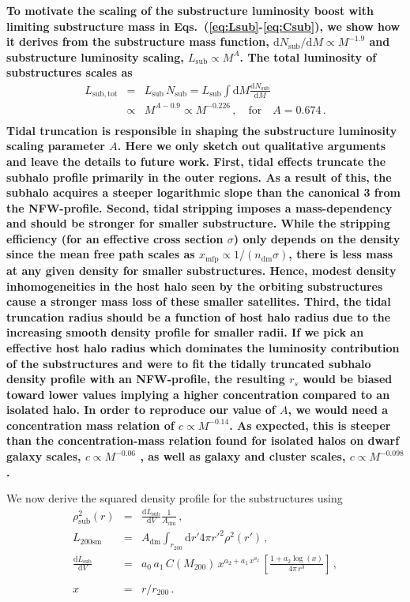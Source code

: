 \documentclass[10pt,aps,pra,reprint,amsmath,amsfonts,amssymb,showpacs,nofootinbib,floatfix]{revtex4-1}
\def\C#1{{\bf #1}}
\newcommand{\rmn}{\mathrm}
\newcommand{\sub}{\rmn{sub}}
\newcommand{\sm}{\rmn{sm}}
\newcommand{\dd}{\rmn{d}}
\newcommand{\rs}{\ensuremath{r_s}}
\newcommand{\rvir}{r_{200}}
\newcommand{\mvir}{M_{200}}
\begin{document}
\C{To motivate the scaling of the substructure luminosity boost with
  limiting substructure mass in Eqs.~(\ref{eq:Lsub}-\ref{eq:Csub}),
  we show how it derives from the substructure mass function, $\dd
  N_\sub/\dd M \propto M^{-1.9}$
  \cite{2008MNRAS.391.1685S,2008Natur.456...73S} and substructure
  luminosity scaling, $L_\sub \propto M^A$. The total luminosity of
  substructures scales as
\begin{eqnarray}
  L_\rmn{sub,tot} &=& L_\sub\,N_\sub = L_\sub 
\int \dd M \frac{\dd N_\sub}{\dd M} \nonumber\\
 &\propto& M^{A-0.9} \propto M^{-0.226}\,,\quad
\rmn{for}\quad A=0.674\,. \nonumber\\
&&
\end{eqnarray}
Tidal truncation is responsible in shaping the substructure luminosity
scaling parameter $A$. Here we only sketch out qualitative arguments
and leave the details to future work. First, tidal effects truncate
the subhalo profile primarily in the outer regions. As a result of
this, the subhalo acquires a steeper logarithmic slope than the
canonical 3 from the NFW-profile. Second, tidal stripping imposes a
mass-dependency and should be stronger for smaller substructure. While
the stripping efficiency (for an effective cross section $\sigma$)
only depends on the density since the mean free path scales as
$x_\rmn{mfp} \propto 1/(n_\rmn{dm} \sigma)$, there is less mass at any
given density for smaller substructures. Hence, modest density
inhomogeneities in the host halo seen by the orbiting substructures
cause a stronger mass loss of these smaller satellites. Third, the
tidal truncation radius should be a function of host halo radius due
to the increasing smooth density profile for smaller radii.  If we
pick an effective host halo radius which dominates the luminosity
contribution of the substructures and were to fit the tidally
truncated subhalo density profile with an NFW-profile, the resulting
$\rs$ would be biased toward lower values implying a higher
concentration compared to an isolated halo. In order to reproduce our
value of $A$, we would need a concentration mass relation of $c\propto
M^{-0.14}$.  As expected, this is steeper than the concentration-mass
relation found for isolated halos on dwarf galaxy scales, $c \propto
M^{-0.06}$ \cite{2011arXiv1101.2020I}, as well as galaxy and cluster
scales, $c \propto M^{-0.098}$ \cite{2008MNRAS.391.1940M}.}

We now derive the squared density profile for the substructures
using
\begin{eqnarray}
\rho_\rmn{sub}^2(r) &=& \frac{\dd L_\rmn{sub}}{\dd V} \frac{1}{A_{\rmn{dm}}}\,,\label{eq:rho_sub}\\
L_{200\sm} &=&  A_{\rmn{dm}} \int_{\rvir} \dd r' 4\pi r'^2 \rho^2(r')\,,\label{eq:Lsm}\\
 \frac{\dd L_\rmn{sub}}{\dd V} &=& a_0\,a_1\,C(\mvir)\,x^{a_2+a_1\,x^{a_2}}\,
\left[\frac{1+a_2\log(x)}{4\pi\,r^3}\right]\,,\nonumber\\
\\
x &=& r/\rvir\,.\label{eq:xvir}
\end{eqnarray} 
\end{document}
